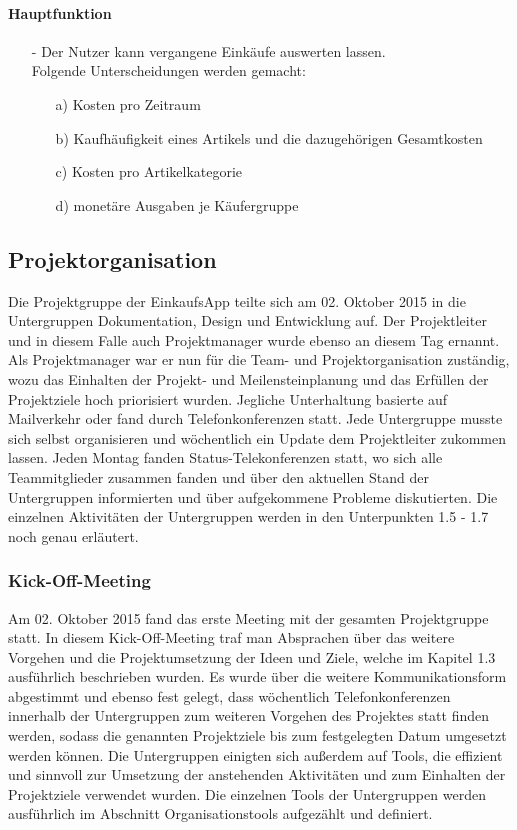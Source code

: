 \documentclass[12pt,a4paper]{article}
\begin{document}
\paragraph{Hauptfunktion}
\begin{itemize}
\item[-]Der Nutzer kann vergangene Einkäufe auswerten lassen. 
\\Folgende Unterscheidungen werden gemacht:
\begin{itemize}
\item[a)]Kosten pro Zeitraum
\item [b)] Kaufhäufigkeit eines Artikels und die dazugehörigen Gesamtkosten
\item[c)] Kosten pro Artikelkategorie
\item[d)] monetäre Ausgaben je Käufergruppe
\end{itemize}
\end{itemize}

\newpage
\subsection{Projektorganisation}
Die Projektgruppe der EinkaufsApp teilte sich am 02. Oktober 2015 in die Untergruppen Dokumentation, Design und Entwicklung auf.
Der Projektleiter und in diesem Falle auch Projektmanager wurde ebenso an diesem Tag ernannt.
Als Projektmanager war er nun für die Team- und Projektorganisation zuständig, wozu das Einhalten der Projekt- und Meilensteinplanung  und das Erfüllen der Projektziele hoch priorisiert wurden.
Jegliche Unterhaltung basierte auf Mailverkehr oder fand durch Telefonkonferenzen statt. Jede Untergruppe musste sich selbst organisieren und wöchentlich ein Update dem Projektleiter zukommen lassen. Jeden Montag fanden Status-Telekonferenzen statt, wo sich alle Teammitglieder zusammen fanden und über den aktuellen Stand der Untergruppen informierten und über aufgekommene Probleme diskutierten. Die einzelnen Aktivitäten der Untergruppen werden in den Unterpunkten  1.5 - 1.7 noch genau erläutert.


\subsubsection{Kick-Off-Meeting}
Am 02. Oktober  2015 fand das erste Meeting mit der gesamten Projektgruppe statt. In diesem Kick-Off-Meeting traf man Absprachen über das weitere Vorgehen und die Projektumsetzung der Ideen und Ziele, welche im Kapitel 1.3 ausführlich beschrieben wurden. Es wurde über die weitere Kommunikationsform abgestimmt und ebenso fest gelegt, dass wöchentlich Telefonkonferenzen innerhalb der Untergruppen zum weiteren Vorgehen des Projektes statt finden werden, sodass die genannten Projektziele bis zum festgelegten Datum umgesetzt werden können. 
Die Untergruppen einigten sich außerdem auf Tools, die effizient und sinnvoll zur Umsetzung der anstehenden Aktivitäten und zum Einhalten der Projektziele verwendet wurden. Die einzelnen Tools der Untergruppen werden ausführlich im Abschnitt Organisationstools aufgezählt und definiert.
\newpage
\end{document}
